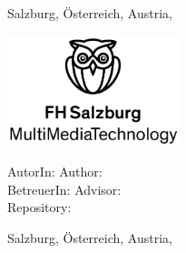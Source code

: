 \begin{titlepage}
{    \vfill
    
    Salzburg, \ifmmtlanguagegerman Österreich, \else Austria, \fi  \thesisdate
    }

\else %

    \begin{center}
    
    \includegraphics[width=5cm]{images/FHSLogo.jpg}


    \vspace*{4cm}
    
    \fontsize{20.79}{18pt}{\selectfont        
    	\textit{\textbf{\titlename}}
    }
    
    \vspace*{4cm}
    
    \fontsize{20.79}{18pt}{%
    \ifmmtlanguagegerman
      \textbf{ \ifmmtpaper Seminararbeit \else Bachelorarbeit \fi }
    \else
        \textbf{ \ifmmtpaper Seminararbeit \else Bachelor Thesis \fi }
    \fi
    }
    
    
    \end{center}
    
    \vfill
    
    \ifmmtlanguagegerman AutorIn: \else Author: \fi  \authorname  \\
    \ifmmtlanguagegerman BetreuerIn: \else Advisor: \fi \advisor \\
    Repository: \thesisrepo \\
    
    Salzburg, \ifmmtlanguagegerman Österreich, \else Austria, \fi \thesisdate
    
    
    

\fi

\end{titlepage}
